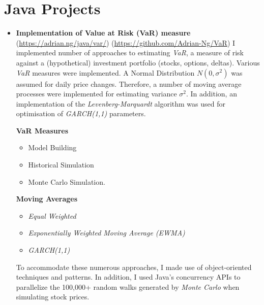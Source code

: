 \documentclass[letterpaper,11pt]{article}
\begin{document}
\section{Java Projects}
\begin{itemize}
	\item {
	      \textbf{Implementation of Value at Risk (VaR) measure}
	      \hfill
	      \tiny
	      (\href{https://adrian.ng/java/var/}{https://adrian.ng/java/var/})
	      \hfill
	      (\href{https://github.com/Adrian-Ng/VaR}{https://github.com/Adrian-Ng/VaR})
	      \newline
	      \small
	      I implemented number of approaches to estimating \textit{VaR}, a measure of risk against a (hypothetical) investment portfolio (stocks, options, deltas). Various \textit{VaR} measures were implemented. A Normal Distribution $N(0, \sigma^2)$ was assumed for daily price changes. Therefore, a number of moving average processes were implemented for estimating variance $\sigma^2$.
	      In addition, an implementation of the \textit{Levenberg-Marquardt} algorithm was used for optimisation of \textit{GARCH(1,1)} parameters.
	      \begin{multicols}{2}
		      \textbf{VaR Measures}
		      \begin{itemize}
			      \item Model Building
			      \item Historical Simulation
			      \item Monte Carlo Simulation.
		      \end{itemize}
		      \columnbreak
		      \textbf{Moving Averages}
		      \begin{itemize}
			      \item \textit{Equal Weighted}
			      \item \textit{Exponentially Weighted Moving Average (EWMA)}
			      \item \textit{GARCH(1,1)}
		      \end{itemize}
	      \end{multicols}
	      To accommodate these numerous approaches, I made use of object-oriented techniques and patterns.
	      In addition, I used Java's concurrency APIs to parallelize the 100,000+ random walks generated by \textit{Monte Carlo} when simulating stock prices.
}
\end{itemize}
\end{document}
